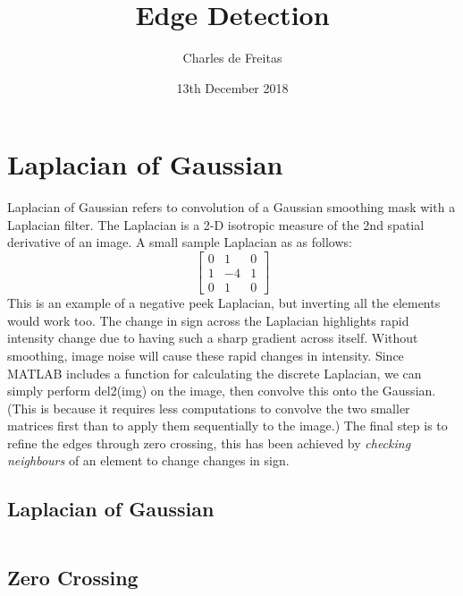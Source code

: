 \documentclass{Resources/UoBLab1}
\begin{document}

\title{Edge Detection}
\author{Charles de Freitas}
\date{13th December 2018}

\maketitle

\section{Laplacian of Gaussian}
Laplacian of Gaussian refers to convolution of a Gaussian smoothing mask with a Laplacian filter.
The Laplacian is a 2-D isotropic measure of the 2nd spatial derivative of an image.\cite{Laplacian}
A small sample Laplacian as as follows:
\[
\begin{bmatrix}
    0 & 1 & 0 \\
    1 & -4 & 1 \\
    0 & 1 & 0
\end{bmatrix}
\]
This is an example of a negative peek Laplacian, but inverting all the elements would work too. The change in sign across the Laplacian highlights rapid intensity change due to having such a sharp gradient across itself. Without smoothing, image noise will cause these rapid changes in intensity.
Since MATLAB includes a function for calculating the discrete Laplacian, we can simply perform
del2(img) on the image, then convolve this onto the Gaussian.
(This is because it requires less computations to convolve the two smaller matrices first than to apply them sequentially to the image.)
The final step is to refine the edges through zero crossing, this has been achieved by \textit{checking neighbours} of an element to change changes in sign.

\subsection{Laplacian of Gaussian}

\inputminted[fontsize=\scriptsize]{octave}{Resources/code/LoG.m}

\subsection{Zero Crossing}

\inputminted[fontsize=\scriptsize]{octave}{Resources/code/check_neighbours.m}\label{code:check_neighbours}
\end{document}
